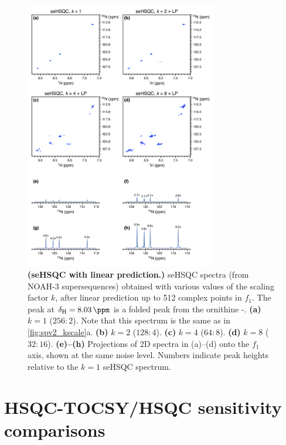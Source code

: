 \begin{figure}
    \centering
    \includegraphics[width=0.75\textwidth]{./figures/spv2_kscale_lp.png}
    \caption{
        \textbf{(seHSQC with linear prediction.)}
        \nitrogen{} seHSQC spectra (from NOAH-3  supersequences) obtained with various values of the scaling factor $k$, after linear prediction up to 512 complex points in $f_1$.
        The peak at $\delta_{\ce{H}} = \SI{8.03}{\ppm}$ is a folded peak from the ornithine \textdelta-.
        \textbf{(a)} $k = 1$ ($256:2$). Note that this spectrum is the same as in \cref{fig:spv2_kscale}a.
        \textbf{(b)} $k = 2$ ($128:4$).
        \textbf{(c)} $k = 4$ ($64:8$).
        \textbf{(d)} $k = 8$ ($32:16$).
        \textbf{(e)--(h)} Projections of 2D spectra in (a)--(d) onto the $f_1$ axis, shown at the same noise level.
        Numbers indicate peak heights relative to the $k = 1$ seHSQC spectrum.
        \grami{}
    }
    \label{fig:spv2_kscale_lp}
\end{figure}

\section{HSQC-TOCSY/HSQC sensitivity comparisons}

